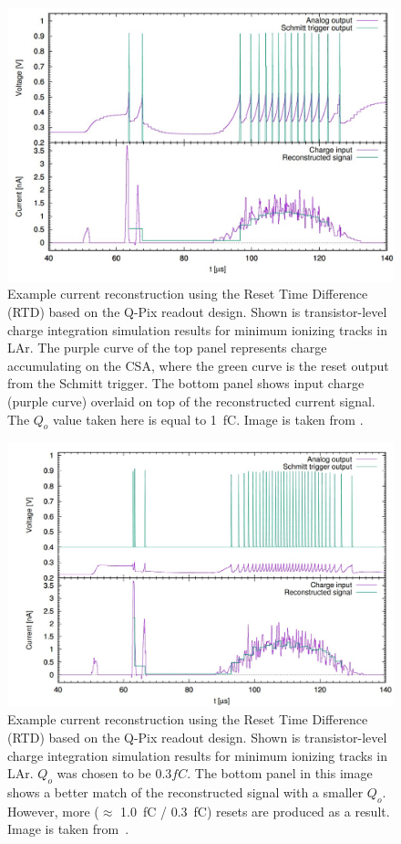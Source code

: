\begin{figure}[]
\centering
\includegraphics[width=\textwidth]{images/qpix_rtd_reconstruction_example.jpg}
\caption{Example current reconstruction using the Reset Time Difference (RTD) based on the Q-Pix readout design. 
Shown is transistor-level charge integration simulation results for minimum ionizing tracks in LAr.
The purple curve of the top panel represents charge accumulating on the CSA, where the green curve is the reset output from the Schmitt trigger.
The bottom panel shows input charge (purple curve) overlaid on top of the reconstructed current signal.
The $Q_{o}$ value taken here is equal to 1~\unit{fC}.
Image is taken from \citep{qpix:nygren:mei}.}
\label{fig:qpixRecon1}
\end{figure}

\begin{figure}[]
\centering
\includegraphics[width=\textwidth]{images/qpix_rtd_reconstruction_example_03fc.jpg}
\caption{Example current reconstruction using the Reset Time Difference (RTD) based on the Q-Pix readout design.
Shown is transistor-level charge integration simulation results for minimum ionizing tracks in LAr.
$Q_{o}$ was chosen to be $0.3 fC$.
The bottom panel in this image shows a better match of the reconstructed signal with a smaller $Q_{o}$. 
However, more ($\approx$ 1.0~\unit{fC} / 0.3~\unit{fC}) resets are produced as a result. 
Image is taken from~\citep{qpix:nygren:mei}.}
\label{fig:qpixRecon2}
\end{figure}

